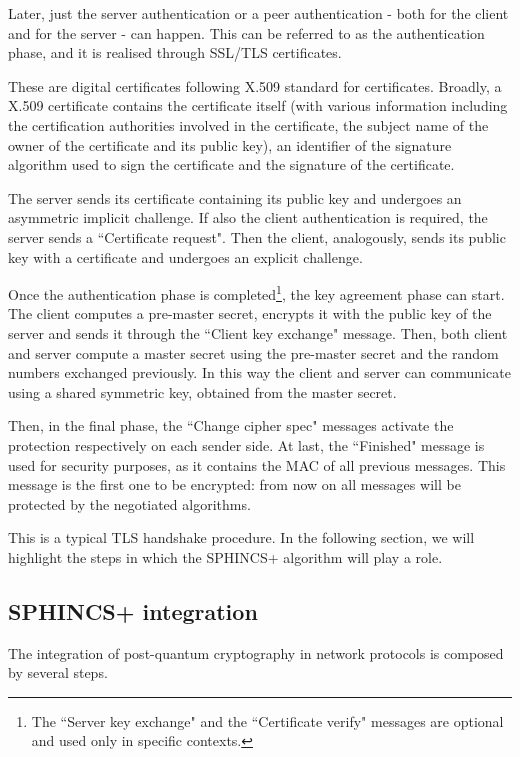 \documentclass[a4paper,12pt]{article}
\begin{document}
Later, just the server authentication or a peer authentication - both for the client and for the server - can happen. This can be referred to as the authentication phase, and it is realised through SSL/TLS certificates.

These are digital certificates following X.509 standard for certificates. Broadly, a X.509 certificate contains the certificate itself (with various information including the certification authorities involved in the certificate, the subject name of the owner of the certificate and its public key), an identifier of the signature algorithm used to sign the certificate and the signature of the certificate.

The server sends its certificate containing its public key and undergoes an asymmetric implicit challenge. If also the client authentication is required, the server sends a ``Certificate request". Then the client, analogously, sends its public key with a certificate and undergoes an explicit challenge.

Once the authentication phase is completed\footnote{The ``Server key exchange" and the ``Certificate verify" messages are optional and used only in specific contexts.}, the key agreement phase can start. The client computes a pre-master secret, encrypts it with the public key of the server and sends it through the ``Client key exchange" message. Then, both client and server compute a master secret using the pre-master secret and the random numbers exchanged previously. In this way the client and server can communicate using a shared symmetric key, obtained from the master secret.

Then, in the final phase, the ``Change cipher spec" messages activate the protection respectively on each sender side. 
At last, the ``Finished" message is used for security purposes, as it contains the MAC of all previous messages. This message is the first one to be encrypted: from now on all messages will be protected by the negotiated algorithms.

This is a typical TLS handshake procedure. In the following section, we will highlight the steps in which the SPHINCS+ algorithm will play a role.

\subsection{SPHINCS+ integration}
\label{sub:integration}

The integration of post-quantum cryptography in network protocols is composed by several steps.
\end{document}
